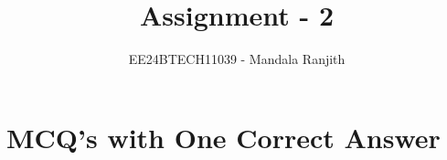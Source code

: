 \documentclass[journal]{IEEEtran}
\begin{document}

\vspace{3cm}

\title{Assignment - 2}
\author{EE24BTECH11039 - Mandala Ranjith
}
{\let\newpage\relax\maketitle}

\renewcommand{\thefigure}{\theenumi}
\renewcommand{\thetable}{\theenumi}
\setlength{\intextsep}{10pt} %


\renewcommand{\thetable}{\theenumi}


\section { MCQ's with One Correct Answer}
\end{document}
